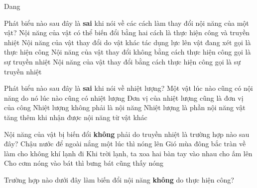 \documentclass[
tuychon=HS1,
pagesize=BookA4,%
company=MAP, %
]{Class/MAPClass}
\renewcommand{\haidong}[1]{}
\begin{document}
\begin{cauhoiTN}{Dang}
\begin{ex}
{\begin{itemize}
		\end{itemize}
	}
\end{ex}
\begin{ex}
	Phát biểu nào sau đây là \textbf{sai} khi nói về các cách làm thay đổi nội năng của một vật?
	\choice
	{Nội năng của vật có thể biến đổi bằng hai cách là thực hiện công và truyền nhiệt}
	{Nội năng của vật thay đổi do vật khác tác dụng lực lên vật đang xét gọi là thực hiện công}
	{Nội năng của vật thay đổi không bằng cách thực hiện công gọi là sự truyền nhiệt}
	{\True Nội năng của vật thay đổi bằng cách thực hiện công gọi là sự truyền nhiệt}
	\haidong{2}\end{ex}
\begin{ex}
	Phát biểu nào sau đây là \textbf{sai} khi nói về nhiệt lượng?
	\choice
	{\True Một vật lúc nào cũng có nội năng do nó lúc nào cũng có nhiệt lượng}
	{Đơn vị của nhiệt lượng cũng là đơn vị của công}
	{Nhiệt lượng không phải là nội năng}
	{Nhiệt lượng là phần nội năng vật tăng thêm khi nhận được nội năng từ vật khác}
	\haidong{2}\end{ex}
\begin{ex}
	Nội năng của vật bị biến đổi \textbf{không} phải do truyền nhiệt là trường hợp nào sau đây?
	\choice
	{Chậu nước để ngoài nắng một lúc thì nóng lên}
	{Gió mùa đông bắc tràn về làm cho không khí lạnh đi}
	{\True Khi trời lạnh, ta xoa hai bàn tay vào nhau cho ấm lên}
	{Cho cơm nóng vào bát thì bưng bát cũng thấy nóng}
	\haidong{3}\end{ex}
\begin{ex}
	Trường hợp nào dưới đây làm biến đổi nội năng \textbf{không} do thực hiện công?

\end{ex}
\end{cauhoiTN}
\end{document}
